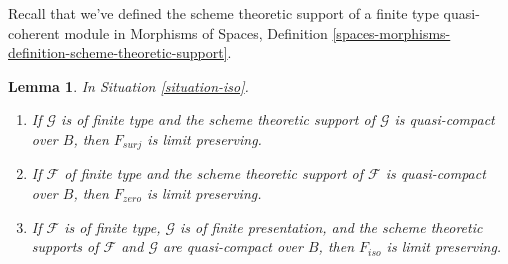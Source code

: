 \documentclass{stacks-project}
\theoremstyle{plain}
\newtheorem{lemma}[subsection]{Lemma}
\theoremstyle{definition}
\theoremstyle{remark}
\numberwithin{equation}{subsection}
\begin{document}
\noindent
Recall that we've defined the scheme theoretic support of a finite
type quasi-coherent module in Morphisms of Spaces, Definition
\ref{spaces-morphisms-definition-scheme-theoretic-support}.

\begin{lemma}
\label{lemma-iso-limits}
In Situation \ref{situation-iso}.
\begin{enumerate}
\item If $\mathcal{G}$ is of finite type and the scheme theoretic support
of $\mathcal{G}$ is quasi-compact over $B$, then $F_{surj}$ is limit
preserving.
\item If $\mathcal{F}$ of finite type and the scheme theoretic support
of $\mathcal{F}$ is quasi-compact over $B$, then
$F_{zero}$ is limit preserving.
\item If $\mathcal{F}$ is of finite type,
$\mathcal{G}$ is of finite presentation, and the
scheme theoretic supports of $\mathcal{F}$ and $\mathcal{G}$ are
quasi-compact over $B$, then $F_{iso}$ is limit preserving.
\end{enumerate}
\end{lemma}
\end{document}
